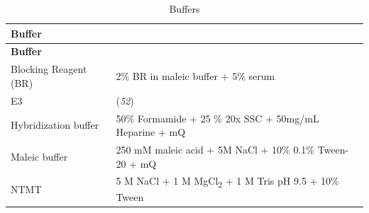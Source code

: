 \documentclass[11pt,singlespacinge,twoside]{reedthesis} %
\theoremstyle{definition}
\theoremstyle{definition}
\theoremstyle{definition}
\theoremstyle{remark}
\begin{document}
\begin{longtable}[]{@{}ll@{}}
\caption{\label{tab:mat-buff} Buffers}\tabularnewline
\toprule
\begin{minipage}[b]{0.23\columnwidth}\raggedright
\textbf{Buffer}\strut
\end{minipage} & \begin{minipage}[b]{0.71\columnwidth}\raggedright
\strut
\end{minipage}\tabularnewline
\midrule
\endfirsthead
\toprule
\begin{minipage}[b]{0.23\columnwidth}\raggedright
\textbf{Buffer}\strut
\end{minipage} & \begin{minipage}[b]{0.71\columnwidth}\raggedright
\strut
\end{minipage}\tabularnewline
\midrule
\endhead
\begin{minipage}[t]{0.23\columnwidth}\raggedright
Blocking Reagent (BR)\strut
\end{minipage} & \begin{minipage}[t]{0.71\columnwidth}\raggedright
2\% BR in maleic buffer + 5\% serum\strut
\end{minipage}\tabularnewline
\begin{minipage}[t]{0.23\columnwidth}\raggedright
E3\strut
\end{minipage} & \begin{minipage}[t]{0.71\columnwidth}\raggedright
(\emph{52})\strut
\end{minipage}\tabularnewline
\begin{minipage}[t]{0.23\columnwidth}\raggedright
Hybridization buffer\strut
\end{minipage} & \begin{minipage}[t]{0.71\columnwidth}\raggedright
50\% Formamide + 25 \% 20x SSC + 50mg/mL Heparine + mQ\strut
\end{minipage}\tabularnewline
\begin{minipage}[t]{0.23\columnwidth}\raggedright
Maleic buffer\strut
\end{minipage} & \begin{minipage}[t]{0.71\columnwidth}\raggedright
250 mM maleic acid + 5M NaCl + 10\% 0.1\% Tween-20 + mQ\strut
\end{minipage}\tabularnewline
\begin{minipage}[t]{0.23\columnwidth}\raggedright
NTMT\strut
\end{minipage} & \begin{minipage}[t]{0.71\columnwidth}\raggedright
5 M NaCl + 1 M MgCl\textsubscript{2} + 1 M Tris pH 9.5 + 10\% Tween\strut

\end{minipage}
\end{longtable}
\end{document}
